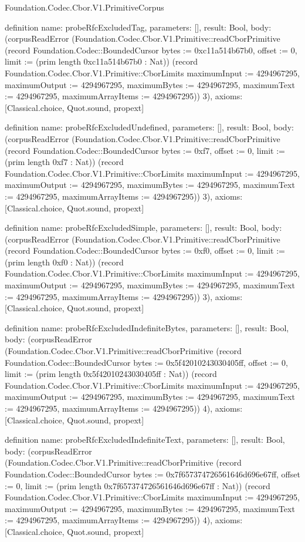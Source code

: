 \begin{lexlean}{Foundation.Codec.Cbor.V1.PrimitiveCorpus}
\begin{semanticmodule}
definition{
  name: probeRfcExcludedTag,
  parameters: [],
  result: Bool,
  body: (corpusReadError (Foundation.Codec.Cbor.V1.Primitive::readCborPrimitive (record Foundation.Codec::BoundedCursor {bytes := 0xc11a514b67b0, offset := 0, limit := (prim length 0xc11a514b67b0 : Nat)}) (record Foundation.Codec.Cbor.V1.Primitive::CborLimits {maximumInput := 4294967295, maximumOutput := 4294967295, maximumBytes := 4294967295, maximumText := 4294967295, maximumArrayItems := 4294967295})) 3),
  axioms: [Classical.choice, Quot.sound, propext]
}

definition{
  name: probeRfcExcludedUndefined,
  parameters: [],
  result: Bool,
  body: (corpusReadError (Foundation.Codec.Cbor.V1.Primitive::readCborPrimitive (record Foundation.Codec::BoundedCursor {bytes := 0xf7, offset := 0, limit := (prim length 0xf7 : Nat)}) (record Foundation.Codec.Cbor.V1.Primitive::CborLimits {maximumInput := 4294967295, maximumOutput := 4294967295, maximumBytes := 4294967295, maximumText := 4294967295, maximumArrayItems := 4294967295})) 3),
  axioms: [Classical.choice, Quot.sound, propext]
}

definition{
  name: probeRfcExcludedSimple,
  parameters: [],
  result: Bool,
  body: (corpusReadError (Foundation.Codec.Cbor.V1.Primitive::readCborPrimitive (record Foundation.Codec::BoundedCursor {bytes := 0xf0, offset := 0, limit := (prim length 0xf0 : Nat)}) (record Foundation.Codec.Cbor.V1.Primitive::CborLimits {maximumInput := 4294967295, maximumOutput := 4294967295, maximumBytes := 4294967295, maximumText := 4294967295, maximumArrayItems := 4294967295})) 3),
  axioms: [Classical.choice, Quot.sound, propext]
}

definition{
  name: probeRfcExcludedIndefiniteBytes,
  parameters: [],
  result: Bool,
  body: (corpusReadError (Foundation.Codec.Cbor.V1.Primitive::readCborPrimitive (record Foundation.Codec::BoundedCursor {bytes := 0x5f42010243030405ff, offset := 0, limit := (prim length 0x5f42010243030405ff : Nat)}) (record Foundation.Codec.Cbor.V1.Primitive::CborLimits {maximumInput := 4294967295, maximumOutput := 4294967295, maximumBytes := 4294967295, maximumText := 4294967295, maximumArrayItems := 4294967295})) 4),
  axioms: [Classical.choice, Quot.sound, propext]
}

definition{
  name: probeRfcExcludedIndefiniteText,
  parameters: [],
  result: Bool,
  body: (corpusReadError (Foundation.Codec.Cbor.V1.Primitive::readCborPrimitive (record Foundation.Codec::BoundedCursor {bytes := 0x7f657374726561646d696e67ff, offset := 0, limit := (prim length 0x7f657374726561646d696e67ff : Nat)}) (record Foundation.Codec.Cbor.V1.Primitive::CborLimits {maximumInput := 4294967295, maximumOutput := 4294967295, maximumBytes := 4294967295, maximumText := 4294967295, maximumArrayItems := 4294967295})) 4),
  axioms: [Classical.choice, Quot.sound, propext]
}


\end{semanticmodule}
\end{lexlean}
